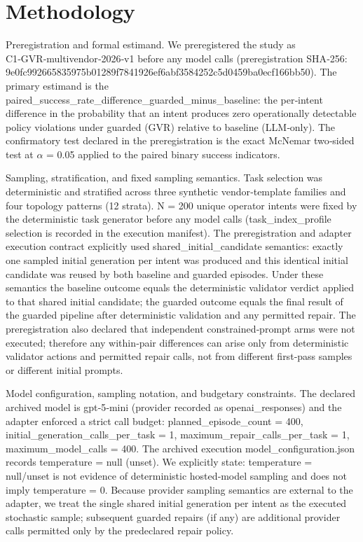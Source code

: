 \documentclass[conference]{IEEEtran}
\begin{document}
\section{Methodology}
Preregistration and formal estimand. We preregistered the study as C1‑GVR‑multivendor‑2026‑v1 before any model calls (preregistration SHA‑256: 9e0fc992\allowbreak{}66583597\allowbreak{}5b01289f\allowbreak{}7841926e\allowbreak{}f6abf358\allowbreak{}4252c5d0\allowbreak{}459ba0ec\allowbreak{}f166bb50). The primary estimand is the paired\_success\_rate\_difference\_guarded\_minus\_baseline: the per‑intent difference in the probability that an intent produces zero operationally detectable policy violations under guarded (GVR) relative to baseline (LLM‑only). The confirmatory test declared in the preregistration is the exact McNemar two‑sided test at \ensuremath{\alpha} = 0.05 applied to the paired binary success indicators.

Sampling, stratification, and fixed sampling semantics. Task selection was deterministic and stratified across three synthetic vendor‑template families and four topology patterns (12 strata). N = 200 unique operator intents were fixed by the deterministic task generator before any model calls (task\_index\_profile selection is recorded in the execution manifest). The preregistration and adapter execution contract explicitly used shared\_initial\_candidate semantics: exactly one sampled initial generation per intent was produced and this identical initial candidate was reused by both baseline and guarded episodes. Under these semantics the baseline outcome equals the deterministic validator verdict applied to that shared initial candidate; the guarded outcome equals the final result of the guarded pipeline after deterministic validation and any permitted repair. The preregistration also declared that independent constrained‑prompt arms were not executed; therefore any within‑pair differences can arise only from deterministic validator actions and permitted repair calls, not from different first‑pass samples or different initial prompts.

Model configuration, sampling notation, and budgetary constraints. The declared archived model is gpt‑5‑mini (provider recorded as openai\_responses) and the adapter enforced a strict call budget: planned\_episode\_count = 400, initial\_generation\_calls\_per\_task = 1, maximum\_repair\_calls\_per\_task = 1, maximum\_model\_calls = 400. The archived execution model\_configuration.json records temperature = null (unset). We explicitly state: temperature = null/unset is not evidence of deterministic hosted‑model sampling and does not imply temperature = 0. Because provider sampling semantics are external to the adapter, we treat the single shared initial generation per intent as the executed stochastic sample; subsequent guarded repairs (if any) are additional provider calls permitted only by the predeclared repair policy.
\end{document}
